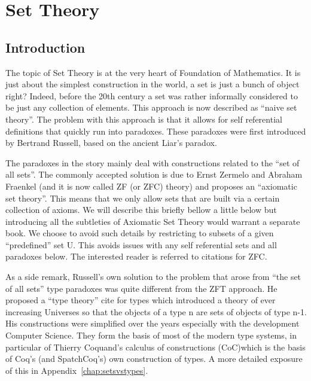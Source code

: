 \chapter{Set Theory}\label{ch:settheory}
\section{Introduction}

The topic of Set Theory is at the very heart of Foundation of Mathematics. It is just about the simplest construction in the world, a set is just a bunch of object right? Indeed, before the 20th century a set was rather informally considered to be just any collection of elements. This approach is now described as ``naive set theory''. The problem with this approach is that it allows for self referential definitions that  quickly run into paradoxes.  These paradoxes were first introduced by Bertrand Russell, based on the ancient Liar's paradox.  

The paradoxes in the story mainly deal with constructions related to the ``set of all sets''. The commonly accepted solution is due to Ernst Zermelo and Abraham Fraenkel (and it is now called ZF (or ZFC) theory) and proposes an ``axiomatic set theory''. This means that we only allow sets that are built via a certain collection of axioms. We will describe this briefly bellow a little below but introducing all  the subtleties of Axiomatic Set Theory would warrant a separate book. We choose to avoid such details by restricting  to  subsets of a given ``predefined'' set U.  This avoids issues with any self referential sets and all paradoxes below. The interested reader is referred to {\color{red} citations for ZFC}.

As a side remark, Russell's own solution to the problem that arose from ``the set of all sets'' type paradoxes  was quite different from the ZFT  approach. He proposed a ``type theory'' {\color{red} cite for types} which introduced a theory of ever increasing Universes so that the objects of a type n are sets of objects of type n-1. His constructions were simplified over the years especially with the development Computer Science. They form the basis of most of the modern type systems, in particular of  Thierry Coquand's calculus of constructions (CoC)which is the basis of  Coq's (and SpatchCoq's) own construction of types.  A more detailed exposure of this in Appendix~\ref{chap:setsvstypes}.

